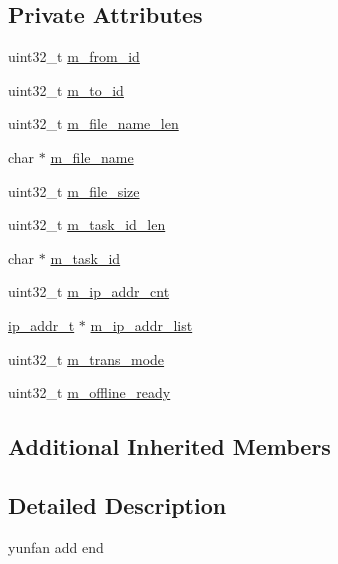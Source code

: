 \subsection*{Private Attributes}
\begin{DoxyCompactItemize}
\item 
uint32\+\_\+t \hyperlink{class_c_im_pdu_file_notify_aec6e8f8dc39e4b01c5a2ad081f3ecfc9}{m\+\_\+from\+\_\+id}
\item 
uint32\+\_\+t \hyperlink{class_c_im_pdu_file_notify_ac650ce75ef4c5d8b3eaafc4a06ff2bd4}{m\+\_\+to\+\_\+id}
\item 
uint32\+\_\+t \hyperlink{class_c_im_pdu_file_notify_a892499bb763997f524778b725e149d22}{m\+\_\+file\+\_\+name\+\_\+len}
\item 
char $\ast$ \hyperlink{class_c_im_pdu_file_notify_a4233c729d8774c818ea1ceace4ac3302}{m\+\_\+file\+\_\+name}
\item 
uint32\+\_\+t \hyperlink{class_c_im_pdu_file_notify_a5488af2ffe6c4572271d949fecad9a88}{m\+\_\+file\+\_\+size}
\item 
uint32\+\_\+t \hyperlink{class_c_im_pdu_file_notify_abfea1044c0077b80ae495425674b8105}{m\+\_\+task\+\_\+id\+\_\+len}
\item 
char $\ast$ \hyperlink{class_c_im_pdu_file_notify_abf33446e7e73b6f6e84c4930376143e8}{m\+\_\+task\+\_\+id}
\item 
uint32\+\_\+t \hyperlink{class_c_im_pdu_file_notify_a9148fade8a000d6ae789a187b92fad14}{m\+\_\+ip\+\_\+addr\+\_\+cnt}
\item 
\hyperlink{structip__addr__t}{ip\+\_\+addr\+\_\+t} $\ast$ \hyperlink{class_c_im_pdu_file_notify_aa34fe36f8cf8a89f56ed81b40e934710}{m\+\_\+ip\+\_\+addr\+\_\+list}
\item 
uint32\+\_\+t \hyperlink{class_c_im_pdu_file_notify_a8af2f4ebba2469832e4b0b2e266891f4}{m\+\_\+trans\+\_\+mode}
\item 
uint32\+\_\+t \hyperlink{class_c_im_pdu_file_notify_ab02574d2f2bc2606a9e7c3b20fe3fdea}{m\+\_\+offline\+\_\+ready}
\end{DoxyCompactItemize}
\subsection*{Additional Inherited Members}


\subsection{Detailed Description}
yunfan add end 

